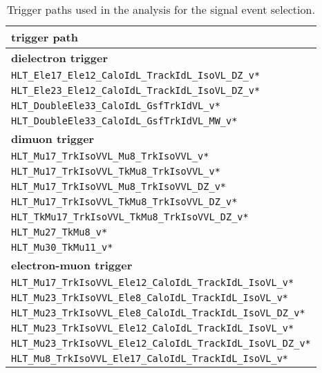 \begin{table}[htb]
 \centering
 \caption{Trigger paths used in the analysis for the signal event selection.}
 \normalsize
 \label{tab:app_trigger1}
 \begin{tabular}[width=\textwidth]{l}
  \hline
  \normalsize{trigger path}                   \\\hline
  \normalsize{\textbf{dielectron trigger}}    \\
  \verb|HLT_Ele17_Ele12_CaloIdL_TrackIdL_IsoVL_DZ_v*|                     \\
  \verb|HLT_Ele23_Ele12_CaloIdL_TrackIdL_IsoVL_DZ_v*|                     \\
  \verb|HLT_DoubleEle33_CaloIdL_GsfTrkIdVL_v*|                     \\
  \verb|HLT_DoubleEle33_CaloIdL_GsfTrkIdVL_MW_v*|                     \\
  \normalsize{\textbf{dimuon trigger}}        \\
  \verb|HLT_Mu17_TrkIsoVVL_Mu8_TrkIsoVVL_v*|                     \\
  \verb|HLT_Mu17_TrkIsoVVL_TkMu8_TrkIsoVVL_v*|                     \\
  \verb|HLT_Mu17_TrkIsoVVL_Mu8_TrkIsoVVL_DZ_v*|                     \\
  \verb|HLT_Mu17_TrkIsoVVL_TkMu8_TrkIsoVVL_DZ_v*|                     \\
  \verb|HLT_TkMu17_TrkIsoVVL_TkMu8_TrkIsoVVL_DZ_v*|                     \\
  \verb|HLT_Mu27_TkMu8_v*|                     \\
  \verb|HLT_Mu30_TkMu11_v*|                     \\
  \normalsize{\textbf{electron-muon trigger}} \\
  \verb|HLT_Mu17_TrkIsoVVL_Ele12_CaloIdL_TrackIdL_IsoVL_v*|                     \\
  \verb|HLT_Mu23_TrkIsoVVL_Ele8_CaloIdL_TrackIdL_IsoVL_v*|                     \\
  \verb|HLT_Mu23_TrkIsoVVL_Ele8_CaloIdL_TrackIdL_IsoVL_DZ_v*|                     \\
  \verb|HLT_Mu23_TrkIsoVVL_Ele12_CaloIdL_TrackIdL_IsoVL_v*|                     \\
  \verb|HLT_Mu23_TrkIsoVVL_Ele12_CaloIdL_TrackIdL_IsoVL_DZ_v*|                     \\
  \verb|HLT_Mu8_TrkIsoVVL_Ele17_CaloIdL_TrackIdL_IsoVL_v*|                     \\

\end{tabular}
\end{table}
